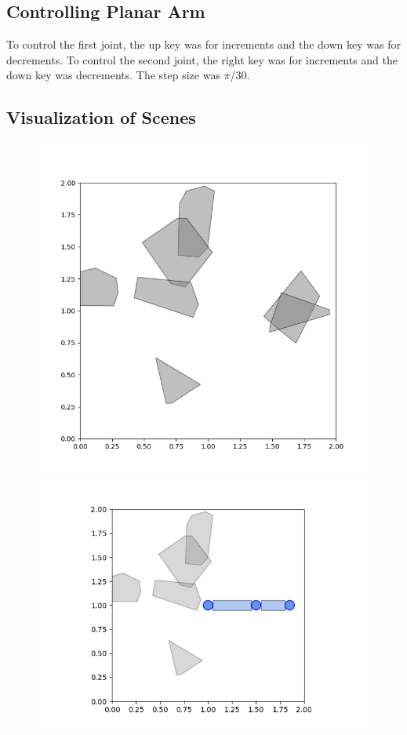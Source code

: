 \documentclass{article}
\begin{document}
\subsection{Controlling Planar Arm}
To control the first joint, the up key was for increments and the down key was for decrements. To control the second joint, the right key was for increments and the down key was decrements. The step size was $\pi$/30.
\subsection{Visualization of Scenes}

\begin{figure}[H]
  \centering
  \begin{minipage}{0.45\textwidth}
    \includegraphics[scale = 0.3]{part4_without_arm.png}
  \end{minipage}\hfill
  \begin{minipage}{0.45\textwidth}
    \includegraphics[width=\linewidth]{part4_with_arm.png}

\end{minipage}
\end{figure}
\end{document}
